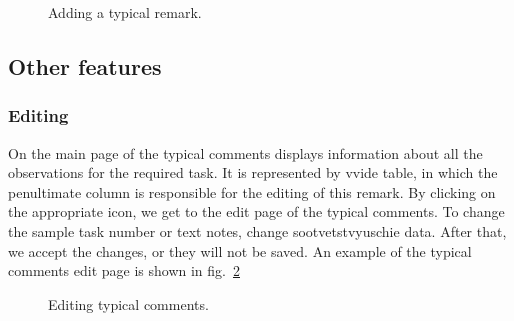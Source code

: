 \documentclass{acmtog} %
\begin{document}
\begin{figure}[h!]
\caption{Adding a typical remark.}
\label{addremark}
\end{figure}

\subsection{Other features}
\subsubsection*{Editing}
On the main page of the typical comments displays information about all the observations for the required task. It is represented by vvide table, in which the penultimate column is responsible for the editing of this remark. By clicking on the appropriate icon, we get to the edit page of the typical comments. To change the sample task number or text notes, change sootvetstvyuschie data. After that, we accept the changes, or they will not be saved. An example of the typical comments edit page is shown in fig.~\ref{editremark}
\begin{figure}[h]
\caption{Editing typical comments.}
\label{editremark}
\end{figure}
\end{document}
